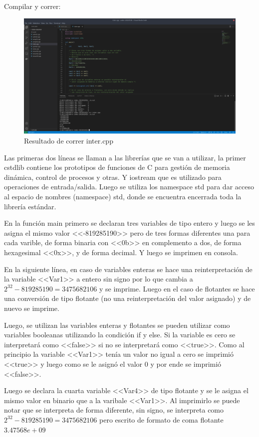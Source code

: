 \documentclass[11pt]{article}
\begin{document}
\begin{itemize}
		\subitem Compilar y correr:
		\begin{figure}[H]
			\centering
			\includegraphics[width=0.7\linewidth]{img2.png}
			\caption{Resultado de correr inter.cpp}
			\label{fig:img2}
		\end{figure}
		
		
		\subitem	Las primeras dos líneas se llaman a las librerías que se van a utilizar, la primer cstdlib  contiene los prototipos de funciones de C para gestión de memoria dinámica, control de procesos y otras. Y iostream que es utilizado para operaciones de entrada/salida. Luego se utiliza los namespace std para dar acceso al espacio de nombres (namespace) std, donde se encuentra encerrada toda la librería estándar.
		
		
		En la función main primero se declaran tres variables de tipo entero y luego se les asigna el mismo valor <<-819285190>> pero de tres formas diferentes una para cada varible, de forma binaria con <<0b>> en complemento a dos, de forma hexagesimal <<0x>>, y de forma decimal. Y luego se imprimen en consola. 
		
		En la siguiente línea, en caso de variables enteras  se  hace una reinterpretación de la variable <<Var1>> a entero sin signo  por lo que cambia a  $2^{32}-819285190=3475682106$ y se imprime. Luego en el caso de flotantes se hace una conversión de tipo flotante (no una reinterpretación del valor asignado) y de nuevo se imprime.
		
		Luego, se utilizan las variables enteras y flotantes se pueden utilizar como variables booleanas utilizando la condición if y else. Si la variable es cero se interpretará como <<false>> si no se interpretará como <<true>>. Como al principio la variable <<Var1>> tenía un valor no igual a cero se imprimió <<true>> y luego como se le asignó el valor 0 y por ende se imprimió <<false>>.
		
		Luego se declara la cuarta variable <<Var4>> de tipo flotante y se le asigna el mismo valor en binario que a la varibale <<Var1>>. Al imprimirlo se puede notar que se interpreta de forma diferente, sin signo, se interpreta como $2^{32}-819285190=3475682106$ pero escrito de formato de coma flotante $3.47568e+09$
		
		
		
		
	\end{itemize}
	
\end{document}
